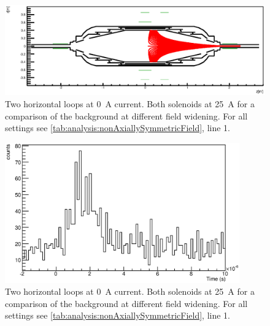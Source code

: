 \begin{figure}
\centering

		\centerline{\includegraphics[width = 1.3\linewidth]{graphics/analysis/monSpec/fieldSimulation/AB.eps} }
	
	\caption[\SI{50}{\ampere} loops]{Two horizontal loops at \SI{0}{\ampere} current. Both solenoids at \SI{25}{\ampere} for a comparison of the background at different field widening. For all settings see \ref{tab:analysis:nonAxiallySymmetricField}, line 1.}
	\label{fig:ABf}
\end{figure}

\begin{figure}[h]
\centering
	\includegraphics[width = 0.9\textwidth]{graphics/analysis/monSpec/AB.eps}
	\caption[\SI{50}{\ampere} loops]{Two horizontal loops at \SI{0}{\ampere} current. Both solenoids at \SI{25}{\ampere} for a comparison of the background at different field widening. For all settings see \ref{tab:analysis:nonAxiallySymmetricField}, line 1.}
	\label{fig:AB}
\end{figure}
\clearpage



